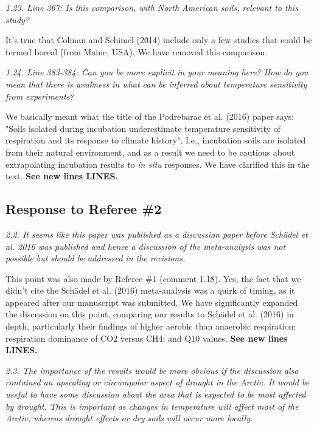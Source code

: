 \documentclass[11pt, oneside]{article}
\begin{document}
\medskip
{\it 1.23. Line 367: Is this comparison, with North American soils, relevant to this study? }

It's true that Colman and Schimel (2014) include only a few studies that could be termed boreal (from Maine, USA). We have removed this comparison.

\medskip
{\it 1.24. Line 383-384: Can you be more explicit in your meaning here? How do you mean that there is weakness in what can be inferred about temperature sensitivity from experiments? }

We basically meant what the title of the Podrebarac et al. (2016) paper says: "Soils isolated during incubation underestimate temperature sensitivity of respiration and its response to climate history". I.e., incubation soils are isolated from their natural environment, and as a result we need to be cautious about extrapolating incubation results to {\it in situ} responses. We have clarified this in the text. {\bf See new lines LINES.}


\newpage
\subsection*{Response to Referee \#2}

{\it 2.2. It seems like this paper was published as a discussion paper before Schädel et al. 2016 was published and hence a discussion of the meta-analysis was not possible but should be addressed in the revisions. }

This point was also made by Referee \#1 (comment 1.18). Yes, the fact that we didn't cite the Schädel et al. (2016) meta-analysis was a quirk of timing, as it appeared after our manuscript was submitted. We have significantly expanded the discussion on this point, comparing our results to Schädel et al. (2016) in depth, particularly their findings of higher aerobic than anaerobic respiration; respiration dominance of CO2 versus CH4; and Q10 values. {\bf See new lines LINES.}

\medskip
{\it 2.3. The importance of the results would be more obvious if the discussion also contained an upscaling or circumpolar aspect of drought in the Arctic. It would be useful to have some discussion about the area that is expected to be most affected by drought. This is important as changes in temperature will affect most of the Arctic, whereas drought effects or dry soils will occur more locally. }
\end{document}
